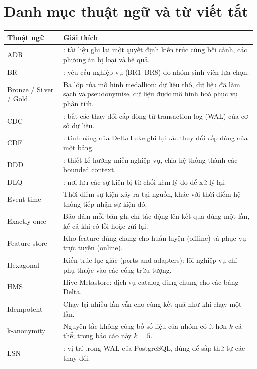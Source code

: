 \chapter*{Danh mục thuật ngữ và từ viết tắt}

{\small
\begin{longtable}{@{}L{3.4cm}L{11.2cm}@{}}
\toprule
\textbf{Thuật ngữ} & \textbf{Giải thích} \\
\midrule
\endhead
ADR & : tài liệu ghi lại một quyết định kiến trúc cùng bối cảnh, các phương án bị loại và hệ quả. \\
BR & : yêu cầu nghiệp vụ (BR1--BR8) do nhóm sinh viên lựa chọn. \\
Bronze / Silver / Gold & Ba lớp của mô hình medallion: dữ liệu thô, dữ liệu đã làm sạch và pseudonymise, dữ liệu được mô hình hoá phục vụ phân tích. \\
CDC & : bắt các thay đổi cấp dòng từ transaction log (WAL) của cơ sở dữ liệu. \\
CDF & : tính năng của Delta Lake ghi lại các thay đổi cấp dòng của một bảng. \\
DDD & : thiết kế hướng miền nghiệp vụ, chia hệ thống thành các bounded context. \\
DLQ & : nơi lưu các sự kiện bị từ chối kèm lý do để xử lý lại. \\
Event time & Thời điểm sự kiện xảy ra tại nguồn, khác với thời điểm hệ thống tiếp nhận sự kiện đó. \\
Exactly-once & Bảo đảm mỗi bản ghi chỉ tác động lên kết quả đúng một lần, kể cả khi có lỗi hoặc gửi lại. \\
Feature store & Kho feature dùng chung cho huấn luyện (offline) và phục vụ trực tuyến (online). \\
Hexagonal & Kiến trúc lục giác (ports and adapters): lõi nghiệp vụ chỉ phụ thuộc vào các cổng trừu tượng. \\
HMS & Hive Metastore: dịch vụ catalog dùng chung cho các bảng Delta. \\
Idempotent & Chạy lại nhiều lần vẫn cho cùng kết quả như khi chạy một lần. \\
k-anonymity & Nguyên tắc không công bố số liệu của nhóm có ít hơn $k$ cá thể; trong báo cáo này $k = 5$. \\
LSN & : vị trí trong WAL của PostgreSQL, dùng để sắp thứ tự các thay đổi. \\

\end{longtable}}
